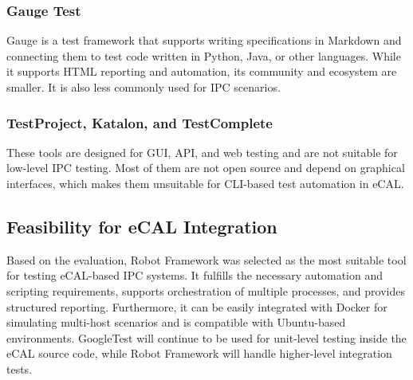 \subsubsection*{Gauge Test}

Gauge is a test framework that supports writing specifications in Markdown and connecting them to test code written in Python, Java, or other languages. While it supports HTML reporting and automation, its community and ecosystem are smaller. It is also less commonly used for IPC scenarios.

\subsubsection*{TestProject, Katalon, and TestComplete}

These tools are designed for GUI, API, and web testing and are not suitable for low-level IPC testing. Most of them are not open source and depend on graphical interfaces, which makes them unsuitable for CLI-based test automation in eCAL.

\subsection{Feasibility for eCAL Integration}

Based on the evaluation, Robot Framework was selected as the most suitable tool for testing eCAL-based IPC systems. It fulfills the necessary automation and scripting requirements, supports orchestration of multiple processes, and provides structured reporting. Furthermore, it can be easily integrated with Docker for simulating multi-host scenarios and is compatible with Ubuntu-based environments. GoogleTest will continue to be used for unit-level testing inside the eCAL source code, while Robot Framework will handle higher-level integration tests.

